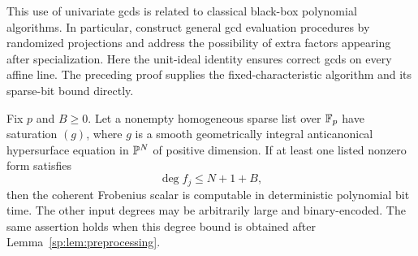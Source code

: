 This use of univariate gcds is related to classical black-box polynomial
algorithms. In particular, \citet[Section~3, pp.~310--311]{sp-kaltofen-trager}
construct general gcd evaluation procedures by randomized projections
and address the possibility of extra factors appearing after
specialization. Here the unit-ideal identity ensures correct gcds on
every affine line. The preceding proof supplies the fixed-characteristic
algorithm and its sparse-bit bound directly.

\begin{theorem}
\label{sp:thm:one-cofactor}
Fix $p$ and $B\geq0$. Let a nonempty homogeneous sparse list over
$\mathbb F_p$ have saturation $(g)$, where $g$ is a smooth geometrically
integral anticanonical hypersurface equation in $\mathbb P^N$ of positive
dimension. If at least one listed nonzero form satisfies
\[
 \deg f_j\leq N+1+B,
\]
then the coherent Frobenius scalar is computable in deterministic
polynomial bit time. The other input degrees may be arbitrarily large
and binary-encoded. The same assertion holds when this degree bound
is obtained after Lemma~\ref{sp:lem:preprocessing}.
\end{theorem}
